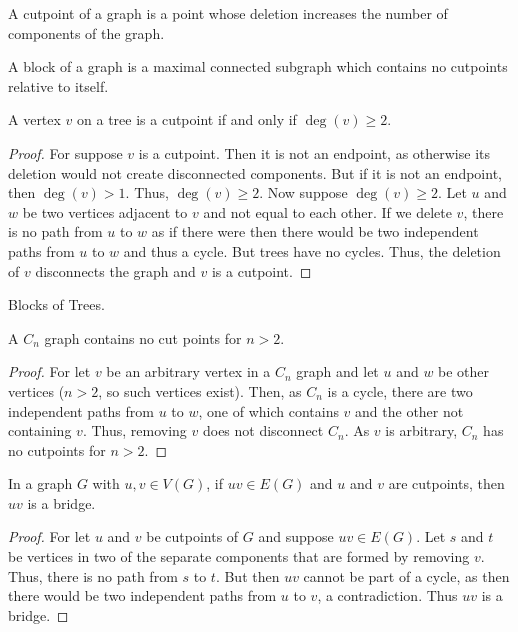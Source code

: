         \begin{definition}
        A cutpoint of a graph is a point whose deletion increases the number of components of the graph.
        \end{definition}
        \begin{definition}
        A block of a graph is a maximal connected subgraph which contains no cutpoints relative to itself.
        \end{definition}
        \begin{theorem}
        A vertex $v$ on a tree is a cutpoint if and only if $\deg(v) \geq 2$.
        \end{theorem}
        \begin{proof}
        For suppose $v$ is a cutpoint. Then it is not an endpoint, as otherwise its deletion would not create disconnected components. But if it is not an endpoint, then $\deg(v)>1$. Thus, $\deg(v)\geq 2$. Now suppose $\deg(v) \geq 2$. Let $u$ and $w$ be two vertices adjacent to $v$ and not equal to each other. If we delete $v$, there is no path from $u$ to $w$ as if there were then there would be two independent paths from $u$ to $w$ and thus a cycle. But trees have no cycles. Thus, the deletion of $v$ disconnects the graph and $v$ is a cutpoint.
        \end{proof}
        \begin{theorem}
        Blocks of Trees.
        \end{theorem}
        \begin{corollary}
        A $C_n$ graph contains no cut points for $n>2$.
        \end{corollary}
        \begin{proof}
        For let $v$ be an arbitrary vertex in a $C_n$ graph and let $u$ and $w$ be other vertices ($n>2$, so such vertices exist). Then, as $C_n$ is a cycle, there are two independent paths from $u$ to $w$, one of which contains $v$ and the other not containing $v$. Thus, removing $v$ does not disconnect $C_n$. As $v$ is arbitrary, $C_n$ has no cutpoints for $n>2$.
        \end{proof}
        \begin{theorem}
        In a graph $G$ with $u,v\in V(G)$, if $uv\in E(G)$ and $u$ and $v$ are cutpoints, then $uv$ is a bridge.
        \end{theorem}
        \begin{proof}
        For let $u$ and $v$ be cutpoints of $G$ and suppose $uv\in E(G)$. Let $s$ and $t$ be vertices in two of the separate components that are formed by removing $v$. Thus, there is no path from $s$ to $t$. But then $uv$ cannot be part of a cycle, as then there would be two independent paths from $u$ to $v$, a contradiction. Thus $uv$ is a bridge.
        \end{proof}
